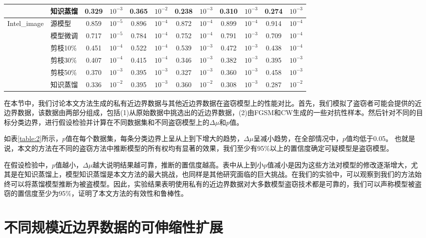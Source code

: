 \begin{table}[h]
{\begin{tabular}{l l c c c c c c c c c c}
								&知识蒸馏  & 0.329 & $10^{-3}$ & 0.365 & $10^{-2}$ & 0.238 & $10^{-3}$ & 0.310 & $10^{-3}$ & 0.274 & $10^{-3}$   \\
		\hline
\multirow{6}{5em}{Intel\_image} &源模型    & 0.859 & $10^{-5}$ & 0.896 & $10^{-4}$ & 0.872 & $10^{-4}$ & 0.899 & $10^{-4}$ & 0.914 & $10^{-4}$   \\
								&模型微调  & 0.717 & $10^{-5}$ & 0.784 & $10^{-4}$ & 0.752 & $10^{-4}$ & 0.791 & $10^{-3}$ & 0.709 & $10^{-4}$   \\
								&剪枝10\%  & 0.451 & $10^{-4}$ & 0.522 & $10^{-4}$ & 0.539 & $10^{-3}$ & 0.472 & $10^{-3}$ & 0.438 & $10^{-4}$   \\
								&剪枝30\%  & 0.407 & $10^{-4}$ & 0.415 & $10^{-4}$ & 0.346 & $10^{-3}$ & 0.382 & $10^{-3}$ & 0.395 & $10^{-3}$   \\
								&剪枝50\%  & 0.370 & $10^{-3}$ & 0.395 & $10^{-3}$ & 0.327 & $10^{-3}$ & 0.360 & $10^{-3}$ & 0.458 & $10^{-3}$   \\
								&知识蒸馏  & 0.336 & $10^{-2}$ & 0.395 & $10^{-3}$ & 0.360 & $10^{-2}$ & 0.308 & $10^{-3}$ & 0.287 & $10^{-2}$   \\
		\hline		
	\end{tabular}
}
\end{table}

在本节中，我们讨论本文方法生成的私有近边界数据与其他近边界数据在盗窃模型上的性能对比。首先，我们模拟了盗窃者可能会提供的近边界数据，该数据由两部分组成，包括(1)从原始数据中挑选出的近边界数据，(2)由FGSM和CW生成的一些对抗性样本。然后针对不同的目标分类边界，进行假设检验并计算在不同数据集和不同盗窃模型上的$\Delta\mu$和$p$值。

如表\ref{table:2}所示，$p$值在每个数据集，每条分类边界上呈从上到下增大的趋势，$\Delta\mu$呈减小趋势，在全部情况中，$p$值均低于0.05。
也就是说，本文的方法在不同的盗窃方法中推断模型的所有权均有显著的效果，我们至少有95\%以上的置信度确定可疑模型是盗窃模型。

在假设检验中，$p$值越小，$\Delta\mu$越大说明结果越可靠，推断的置信度越高。表中从上到小$p$值减小是因为这些方法对模型的修改逐渐增大，尤其是在知识蒸馏上，模型知识蒸馏是本文方法的最大挑战，也同样是其他研究面临的巨大挑战。在我们的实验中，可以观察到我们的方法始终可以将蒸馏模型推断为被盗模型。因此，实验结果表明使用私有的近边界数据对大多数模型盗窃技术都是可靠的，我们可以声称模型被盗窃的置信度至少为95\%，证明了本文方法的有效性和鲁棒性。


\section{不同规模近边界数据的可伸缩性扩展}\label{5.6}

